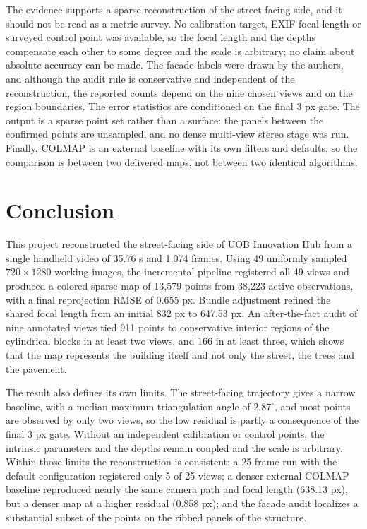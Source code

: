 \documentclass[11pt,a4paper]{article}
\begin{document}
The evidence supports a sparse reconstruction of the street-facing side, and it should not be read as a metric survey. No calibration target, EXIF focal length or surveyed control point was available, so the focal length and the depths compensate each other to some degree and the scale is arbitrary; no claim about absolute accuracy can be made. The facade labels were drawn by the authors, and although the audit rule is conservative and independent of the reconstruction, the reported counts depend on the nine chosen views and on the region boundaries. The error statistics are conditioned on the final 3 px gate. The output is a sparse point set rather than a surface: the panels between the confirmed points are unsampled, and no dense multi-view stereo stage was run. Finally, COLMAP is an external baseline with its own filters and defaults, so the comparison is between two delivered maps, not between two identical algorithms.

\section{Conclusion}
\label{sec:conclusion}

This project reconstructed the street-facing side of UOB Innovation Hub from a single handheld video of 35.76 s and 1{,}074 frames. Using 49 uniformly sampled \(720 \times 1280\) working images, the incremental pipeline registered all 49 views and produced a colored sparse map of 13{,}579 points from 38{,}223 active observations, with a final reprojection RMSE of 0.655 px. Bundle adjustment refined the shared focal length from an initial 832 px to 647.53 px. An after-the-fact audit of nine annotated views tied 911 points to conservative interior regions of the cylindrical blocks in at least two views, and 166 in at least three, which shows that the map represents the building itself and not only the street, the trees and the pavement.

The result also defines its own limits. The street-facing trajectory gives a narrow baseline, with a median maximum triangulation angle of \(2.87^{\circ}\), and most points are observed by only two views, so the low residual is partly a consequence of the final 3 px gate. Without an independent calibration or control points, the intrinsic parameters and the depths remain coupled and the scale is arbitrary. Within those limits the reconstruction is consistent: a 25-frame run with the default configuration registered only 5 of 25 views; a denser external COLMAP baseline reproduced nearly the same camera path and focal length (638.13 px), but a denser map at a higher residual (0.858 px); and the facade audit localizes a substantial subset of the points on the ribbed panels of the structure.
\end{document}
